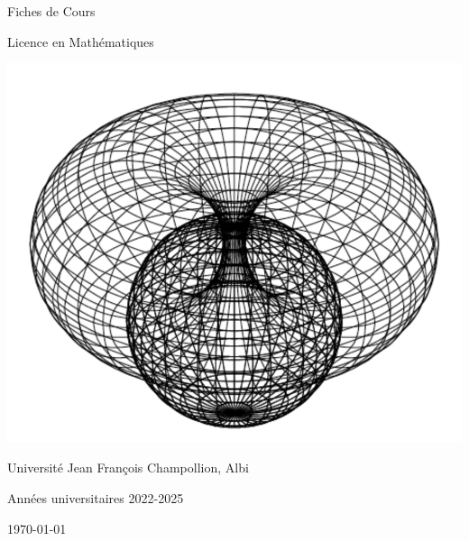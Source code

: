\begin{titlepage}
    \centering
    \vspace*{2cm}

    \Huge
    Fiches de Cours

    \huge 
    Licence en Mathématiques

    \vspace{3.0cm}


    \begin{center}
        \includegraphics[scale=0.7]{./images/titlepage.png}
    \end{center}

    \vfill

    \LARGE
    Université Jean François Champollion, Albi

    \Large
    Années universitaires 2022-2025

    \vspace{0.8cm}

    \today
\end{titlepage}
